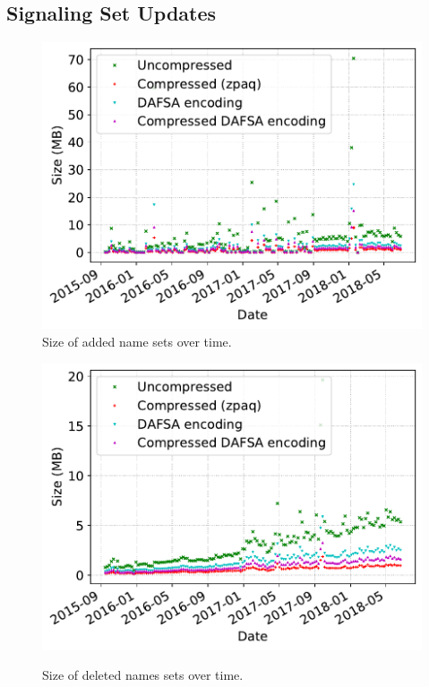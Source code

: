 \subsection{Signaling Set Updates}
\label{sec:evaluation:updates}


\begin{figure}[t]
  \centering
  \includegraphics[width=\linewidth]{fig/added_name_set_size}
  \caption{Size of added name sets over time.}
  \label{fig:updates:added}
\end{figure}

\begin{figure}[t]
  \centering
  \includegraphics[width=\linewidth]{fig/deleted_name_set_size}
  \label{fig:updates:deleted}
  \caption{Size of deleted names sets over time.}
  \label{fig:updates}
\end{figure}

